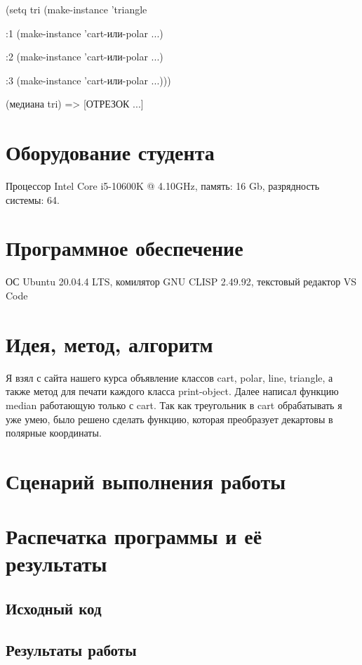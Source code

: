 \documentclass[12pt]{article}
\begin{document}
(setq tri (make-instance 'triangle

		\hspace{52pt}:1 (make-instance 'cart-или-polar ...)

		\hspace{52pt}:2 (make-instance 'cart-или-polar ...)

		\hspace{52pt}:3 (make-instance 'cart-или-polar ...)))

(медиана tri) => [ОТРЕЗОК ...]\\


\section{Оборудование студента}
Процессор Intel Core i5-10600K @ 4.10GHz, память: 16 Gb, разрядность системы: 64.

\section{Программное обеспечение}
ОС Ubuntu 20.04.4 LTS, комилятор GNU CLISP 2.49.92, текстовый редактор VS Code

\pagebreak
\section{Идея, метод, алгоритм}
Я взял с сайта нашего курса объявление классов cart, polar, line, triangle, а также метод для
печати каждого класса print-object. Далее написал функцию median работающую только с cart. Так как треугольник в cart обрабатывать я уже умею, было решено сделать функцию, которая преобразует декартовы в полярные координаты.

\section{Сценарий выполнения работы}

\section{Распечатка программы и её результаты}

\subsection{Исходный код}


\pagebreak
\subsection{Результаты работы}

\end{document}
